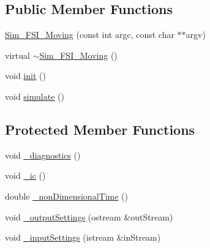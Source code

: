 \subsection*{Public Member Functions}
\begin{DoxyCompactItemize}
\item 
\hyperlink{class_sim___f_s_i___moving_a6bf59570d685a1bb99517fb4a1aa010e}{Sim\+\_\+\+F\+S\+I\+\_\+\+Moving} (const int argc, const char $\ast$$\ast$argv)
\item 
virtual \hyperlink{class_sim___f_s_i___moving_a7de21a74e73f85426584ec607abc06ee}{$\sim$\+Sim\+\_\+\+F\+S\+I\+\_\+\+Moving} ()
\item 
void \hyperlink{class_sim___f_s_i___moving_abaea71814c7a3cedf36817d0c0da3efc}{init} ()
\item 
void \hyperlink{class_sim___f_s_i___moving_ae20d894ac95fb1e13de88147a8bc1b3e}{simulate} ()
\end{DoxyCompactItemize}
\subsection*{Protected Member Functions}
\begin{DoxyCompactItemize}
\item 
void \hyperlink{class_sim___f_s_i___moving_aa858863674a7bffcdbaddb3aadd2f68d}{\+\_\+diagnostics} ()
\item 
void \hyperlink{class_sim___f_s_i___moving_a45d9af44039a61a6a4164f90869edd27}{\+\_\+ic} ()
\item 
double \hyperlink{class_sim___f_s_i___moving_a2afeea28eff7119bfa2efcf4afc381eb}{\+\_\+non\+Dimensional\+Time} ()
\item 
void \hyperlink{class_sim___f_s_i___moving_a145a2c973658bdb03d89ff9cfc5a39ef}{\+\_\+output\+Settings} (ostream \&out\+Stream)
\item 
void \hyperlink{class_sim___f_s_i___moving_ae0613f576d332cd5c494003561dd415a}{\+\_\+input\+Settings} (istream \&in\+Stream)
\end{DoxyCompactItemize}
